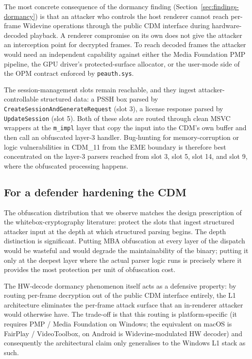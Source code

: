 \documentclass[11pt,letterpaper]{article}
\begin{document}
The most concrete consequence of the dormancy finding
(Section~\ref{sec:findings-dormancy}) is that an attacker who
controls the host renderer cannot reach per-frame Widevine
operations through the public CDM interface during hardware-decoded
playback. A renderer compromise on its own does not give the
attacker an interception point for decrypted frames. To reach
decoded frames the attacker would need an independent
capability against either the Media Foundation PMP pipeline, the
GPU driver's protected-surface allocator, or the user-mode side of
the OPM contract enforced by \texttt{peauth.sys}.

The session-management slots remain reachable, and they ingest
attacker-controllable structured data: a PSSH box parsed by
\texttt{CreateSessionAndGenerateRequest} (slot 3), a license
response parsed by \texttt{UpdateSession} (slot 5). Both of these
slots are routed through clean MSVC wrappers at the
\texttt{m\_impl} layer that copy the input into the CDM's own
buffer and then call an obfuscated layer-3 handler. Bug-hunting
for memory-corruption or logic vulnerabilities in CDM\_11 from
the EME boundary is therefore best concentrated on the layer-3
parsers reached from slot 3, slot 5, slot 14, and slot 9, where the
obfuscated processing happens.

\subsection{For a defender hardening the CDM}

The obfuscation distribution that we observe matches the design
prescription of the whitebox-cryptography literature: protect
the slots that ingest structured attacker input at the depth at
which structured parsing begins. The depth distinction is
significant. Putting MBA obfuscation at every layer of the dispatch
would be wasteful and would degrade the maintainability of the
binary; putting it only at the deepest layer where the actual
parser logic runs is precisely where it provides the most
protection per unit of obfuscation cost.

The HW-decode dormancy phenomenon itself acts as a defensive
property: by routing per-frame decryption out of the public CDM
interface entirely, the L1 architecture eliminates the per-frame
attack surface that an in-renderer attacker would otherwise have.
The trade-off is that this routing is platform-specific (it
requires PMP / Media Foundation on Windows; the equivalent on
macOS is FairPlay / VideoToolbox, on Android is Widevine-modulated
HW decoder) and consequently the architectural claim only
generalises to the Windows L1 stack as such.
\end{document}

